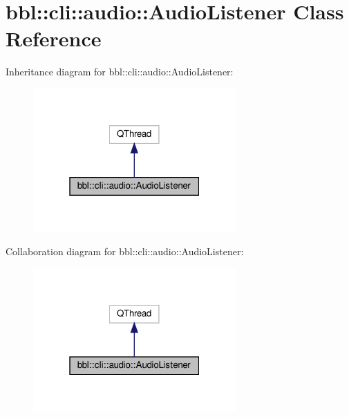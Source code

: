 \hypertarget{classbbl_1_1cli_1_1audio_1_1_audio_listener}{}\section{bbl\+:\+:cli\+:\+:audio\+:\+:Audio\+Listener Class Reference}
\label{classbbl_1_1cli_1_1audio_1_1_audio_listener}


Inheritance diagram for bbl\+:\+:cli\+:\+:audio\+:\+:Audio\+Listener\+:
\nopagebreak
\begin{figure}[H]
\begin{center}
\leavevmode
\includegraphics[width=220pt]{classbbl_1_1cli_1_1audio_1_1_audio_listener__inherit__graph}
\end{center}
\end{figure}


Collaboration diagram for bbl\+:\+:cli\+:\+:audio\+:\+:Audio\+Listener\+:
\nopagebreak
\begin{figure}[H]
\begin{center}
\leavevmode
\includegraphics[width=220pt]{classbbl_1_1cli_1_1audio_1_1_audio_listener__coll__graph}
\end{center}
\end{figure}
